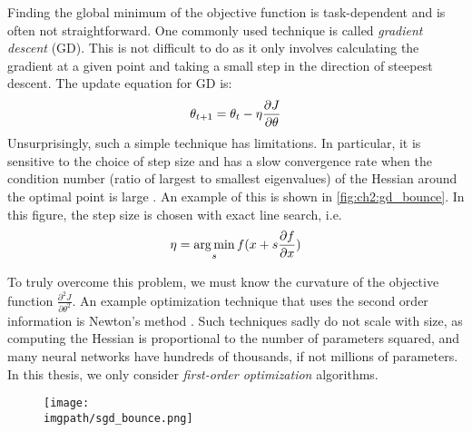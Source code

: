   Finding the global minimum of the objective
  function is task-dependent and is often not straightforward. One commonly used
  technique is called \emph{gradient descent} (GD). This is not difficult to do as
  it only involves calculating the gradient at a given point and taking a small
  step in the direction of steepest descent. The update equation for GD is: 
  \begin{equation}\label{eq:ch2:gd}
    \theta_{t+1} = \theta_t - \eta \frac{\partial J}{\partial \theta}
  \end{equation}
  Unsurprisingly, such a simple technique has limitations. In particular, it
  is sensitive to the choice of step size and
  has a slow convergence rate when the condition number (ratio of largest to 
  smallest eigenvalues) of the Hessian around the optimal point is large
  \cite{boyd_convex_2004}. An example of this is shown in
  \autoref{fig:ch2:gd_bounce}. In this figure, the step size is chosen with
  exact line search, i.e.
  \begin{equation}\label{eq:ch2:search}
    \eta = \operatorname*{arg\,min}_s f(x + s \frac{\partial f}{\partial x})
  \end{equation}  
  
  To truly overcome this problem, we must know the curvature
  of the objective function $\frac{\partial^2 J}{\partial \theta^2}$. An example
  optimization technique that uses the second order information is Newton's
  method \cite[Chapter~9]{boyd_convex_2004}. Such techniques sadly do not scale
  with size, as computing the Hessian is proportional to the number of
  parameters squared, and many neural networks have hundreds of thousands, if
  not millions of parameters. In this thesis, we only consider \emph{first-order
  optimization} algorithms.

  \begin{figure}[t]
  \centering
  \texttt{[image: \\imgpath/sgd\_bounce.png]}
  \label{fig:ch2:gd_bounce}
\end{figure}

